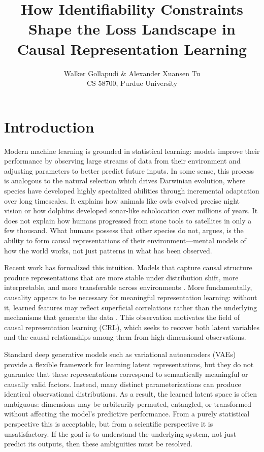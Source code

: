 \documentclass{article} %
\title{How Identifiability Constraints Shape the Loss Landscape in Causal Representation Learning}
\author{Walker Gollapudi \& Alexander Xuansen Tu \\
CS 58700, Purdue University\\
}
\begin{document}
\maketitle

\section{Introduction}

Modern machine learning is grounded in statistical learning: models improve their performance by observing large streams of data from their environment and adjusting parameters to better predict future inputs. In some sense, this process is analogous to the natural selection which drives Darwinian evolution, where species have developed highly specialized abilities through incremental adaptation over long timescales. It explains how animals like owls evolved precise night vision or how dolphins developed sonar-like echolocation over millions of years. It does not explain how humans progressed from stone tools to satellites in only a few thousand. What humans possess that other species do not, \citet{Pearl2018SevenSparks} argues, is the ability to form causal representations of their environment—mental models of how the world works, not just patterns in what has been observed.

Recent work has formalized this intuition. Models that capture causal structure produce representations that are more stable under distribution shift, more interpretable, and more transferable across environments \cite{Richens2024RobustAgents}. More fundamentally, causality appears to be necessary for meaningful representation learning: without it, learned features may reflect superficial correlations rather than the underlying mechanisms that generate the data \cite{Scholkopf2021CRL, VonKugelgen2024IdentifiableCRL}. This observation motivates the field of causal representation learning (CRL), which seeks to recover both latent variables and the causal relationships among them from high-dimensional observations.

Standard deep generative models such as variational autoencoders (VAEs) provide a flexible framework for learning latent representations, but they do not guarantee that these representations correspond to semantically meaningful or causally valid factors. Instead, many distinct parameterizations can produce identical observational distributions. As a result, the learned latent space is often ambiguous: dimensions may be arbitrarily permuted, entangled, or transformed without affecting the model's predictive performance. From a purely statistical perspective this is acceptable, but from a scientific perspective it is unsatisfactory. If the goal is to understand the underlying system, not just predict its outputs, then these ambiguities must be resolved.
\end{document}
